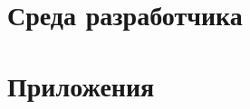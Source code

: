 \documentclass[12pt,a4paper,openany]{book}
\begin{document}
\part{Среда разработчика}





\part{Приложения}
\appendix




\end{document}
